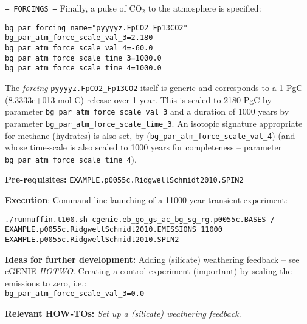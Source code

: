 \documentclass[10pt,twoside]{article}
\begin{document}
\begin{compactitem}
                \item \texttt{--- FORCINGS ---}
Finally, a pulse of CO$_{2}$ to the atmosphere is specified:
\vspace{-5pt}\begin{verbatim}
bg_par_forcing_name="pyyyyz.FpCO2_Fp13CO2"
bg_par_atm_force_scale_val_3=2.180
bg_par_atm_force_scale_val_4=-60.0
bg_par_atm_force_scale_time_3=1000.0
bg_par_atm_force_scale_time_4=1000.0
                \end{verbatim}\vspace{-5pt}
The \textit{forcing} \texttt{pyyyyz.FpCO2\_Fp13CO2} itself is generic and corresponds to a 1 PgC (8.3333e+013 mol C) release over 1 year. This is scaled to 2180 PgC by parameter \texttt{bg\_par\_atm\_force\_scale\_val\_3} and a duration of 1000 years by parameter \texttt{bg\_par\_atm\_force\_scale\_time\_3}. An isotopic signature appropriate for methane (hydrates) is also set, by (\texttt{bg\_par\_atm\_force\_scale\_val\_4}) (and whose time-scale is also scaled to 1000 years for completeness --  parameter \texttt{bg\_par\_atm\_force\_scale\_time\_4}).
        \end{compactitem}

\noindent \textbf{Pre-requisites:} \texttt{EXAMPLE.p0055c.RidgwellSchmidt2010.SPIN2}

\noindent \textbf{Execution}: Command-line launching of a 11000 year transient experiment:
\vspace{-10pt}\small\begin{verbatim}
./runmuffin.t100.sh cgenie.eb_go_gs_ac_bg_sg_rg.p0055c.BASES / 
EXAMPLE.p0055c.RidgwellSchmidt2010.EMISSIONS 11000 
EXAMPLE.p0055c.RidgwellSchmidt2010.SPIN2
\end{verbatim}\normalsize\vspace{-10pt}

\noindent \textbf{Ideas for further development:} Adding (silicate) weathering feedback -- see cGENIE \textit{HOTWO}. Creating a control experiment (important) by scaling the emissions to zero, i.e.:
\\\texttt{bg\_par\_atm\_force\_scale\_val\_3=0.0}

\noindent \textbf{Relevant HOW-TOs:} \textit{Set up a (silicate) weathering feedback}.

\end{document}
